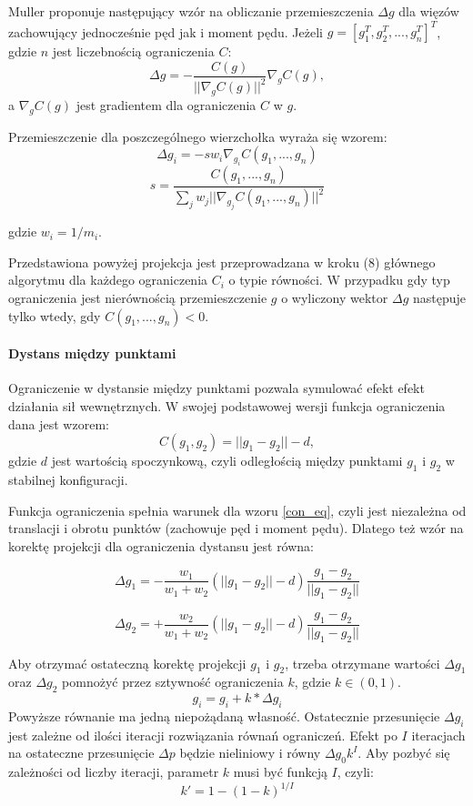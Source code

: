 Muller proponuje następujący wzór na obliczanie przemieszczenia $\Delta g$ dla
więzów zachowujący jednocześnie pęd jak i moment pędu.
Jeżeli $g = [ g_1^T, g_2^T, ..., g_n^T]^T$, gdzie $n$ jest liczebnością
ograniczenia $C$:
\begin{equation} \label{con_eq}
\Delta g = - \frac{C(g)}{|| \nabla_g C(g) ||^2}\nabla_g C(g),
\end{equation}
a $\nabla_g C(g)$ jest gradientem dla ograniczenia $C$ w $g$.

Przemieszczenie dla poszczególnego wierzchołka wyraża się wzorem:
$$\Delta g_i = -s w_i\nabla_{g_i}C(g_1, ..., g_n)$$ 
$$ s = \frac{C(g_1, ..., g_n)}{\sum_j w_j|| \nabla_{g_j}C(g_1, ..., g_n)
	||^2}$$

gdzie $w_i = 1 / m_i$.

Przedstawiona powyżej projekcja jest przeprowadzana w kroku (8) głównego
algorytmu dla każdego ograniczenia $C_i$ o typie równości.
W przypadku gdy typ ograniczenia jest nierównością przemieszczenie $g$
o wyliczony wektor $\Delta g$ następuje tylko wtedy, gdy $C(g_1, ...,
		g_n) < 0$.

\paragraph{Dystans między punktami}
Ograniczenie w dystansie między punktami pozwala symulować efekt efekt działania
sił wewnętrznych. W swojej podstawowej wersji funkcja ograniczenia dana jest wzorem:
$$ C(g_1, g_2) = || g_1 - g_2 || - d,$$ 
gdzie $d$ jest wartością
spoczynkową, czyli odległością między punktami $g_1$ i $g_2$ w stabilnej
konfiguracji.

Funkcja ograniczenia spełnia warunek dla wzoru \ref{con_eq}, czyli jest
niezależna od translacji i obrotu punktów (zachowuje pęd i moment pędu).
Dlatego też wzór na korektę projekcji dla
ograniczenia dystansu jest równa:

$$\Delta g_1 = - \frac{w_1}{w_1 + w_2} (|| g_1 - g_2 || - d)\frac{g_1 -
	g_2}{|| g_1 - g_2 ||}$$

$$\Delta g_2 = + \frac{w_2}{w_1 + w_2} (|| g_1 - g_2 || - d)\frac{g_1 -
	g_2}{|| g_1 - g_2 ||}$$

Aby otrzymać ostateczną korektę projekcji $g_1$ i $g_2$,
	trzeba otrzymane wartości $\Delta g_1$ oraz $\Delta g_2$ pomnożyć przez
	sztywność ograniczenia $k$, gdzie $k \in (0, 1)$. 
	$$ g_i = g_i + k * \Delta g_i$$
Powyższe równanie ma jedną niepożądaną własność. Ostatecznie przesunięcie
$\Delta g_i$ jest zależne od ilości iteracji rozwiązania równań ograniczeń.
Efekt po $I$ iteracjach na ostateczne przesunięcie $\Delta p$ będzie
nieliniowy i równy $\Delta g_0 k^I$. Aby pozbyć się zależności od liczby
iteracji, parametr $k$ musi być funkcją $I$, czyli: $$ k' = 1 - (1 -
		k)^{1/I}$$

